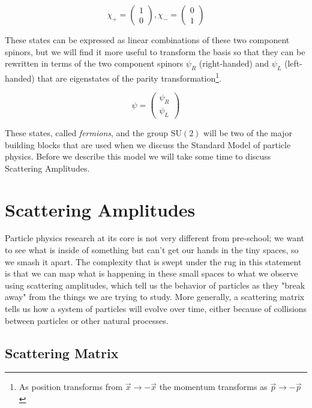 \begin{equation}
\label{eq:spinors}
\chi_{+} = \begin{pmatrix} 1 \\ 0 \end{pmatrix}, \chi_{-} = \begin{pmatrix} 0\\1\end{pmatrix}
\end{equation}

These states can be expressed as linear combinations of these two component spinors, but we will find it more useful to transform the basis so that they can be rewritten in terms of the two component spinors $\psi_{R}$ (right-handed) and $\psi_{L}$ (left-handed) that are eigenstates of the parity transformation\footnote{As position transforms from $\vec{x} \to -\vec{x}$ the momentum transforms as $\vec{p} \to -\vec{p}$}.

\begin{equation}
\label{eq:TwoRandL}
\psi = \begin{pmatrix} \psi_{R} \\ \psi_{L} \end{pmatrix}
\end{equation}

These states, called \textit{fermions}, and the group $\mathrm{SU}(2)$ will be two of the major building blocks that are used when we discuss the Standard Model of particle physics. Before we describe this model we will take some time to discuss Scattering Amplitudes.

\section{Scattering Amplitudes}
\label{sec:Scattering}

Particle physics research at its core is not very different from pre-school; we want to see what is inside of something but can't get our hands in the tiny spaces, so we smash it apart. The complexity that is swept under the rug in this statement is that we can map what is happening in these small spaces to what we observe using scattering amplitudes, which tell us the behavior of particles as they "break away" from the things we are trying to study. More generally, a scattering matrix tells us how a system of particles will evolve over time, either because of collisions between particles or other natural processes.

\subsection{Scattering Matrix}
\label{sec:Smatrix}

